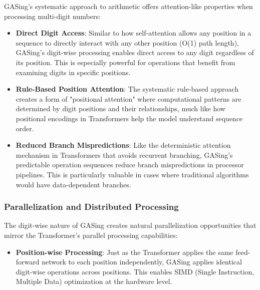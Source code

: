 GASing's systematic approach to arithmetic offers attention-like properties when processing multi-digit numbers:

\begin{itemize}
\item \textbf{Direct Digit Access}: Similar to how self-attention allows any position in a sequence to directly interact with any other position (O(1) path length), GASing's digit-wise processing enables direct access to any digit regardless of its position. This is especially powerful for operations that benefit from examining digits in specific positions.
\end{itemize}

\begin{itemize}
\item \textbf{Rule-Based Position Attention}: The systematic rule-based approach creates a form of "positional attention" where computational patterns are determined by digit positions and their relationships, much like how positional encodings in Transformers help the model understand sequence order.
\end{itemize}

\begin{itemize}
\item \textbf{Reduced Branch Mispredictions}: Like the deterministic attention mechanism in Transformers that avoids recurrent branching, GASing's predictable operation sequences reduce branch mispredictions in processor pipelines. This is particularly valuable in cases where traditional algorithms would have data-dependent branches.
\end{itemize}
\subsubsection{Parallelization and Distributed Processing}

The digit-wise nature of GASing creates natural parallelization opportunities that mirror the Transformer's parallel processing capabilities:

\begin{itemize}
\item \textbf{Position-wise Processing}: Just as the Transformer applies the same feed-forward network to each position independently, GASing applies identical digit-wise operations across positions. This enables SIMD (Single Instruction, Multiple Data) optimization at the hardware level.
\end{itemize}

